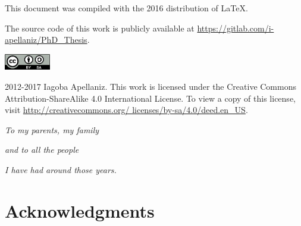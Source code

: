 \documentclass[12pt, letterpaper, twoside]{article}
\numberwithin{equation}{section}
\numberwithin{figure}{section}
\numberwithin{table}{section}
\begin{document}
\renewcommand{\thefootnote}{\fnsymbol{footnote}}

\pagestyle{fancy}
\renewcommand{\headrulewidth}{0pt}
\fancyhead{}
\fancyfoot{}





\cleardoublepage

This document was compiled with the 2016 distribution of \LaTeX.

The source code of this work is publicly available at \url{https://gitlab.com/i-apellaniz/PhD_Thesis}.

\vfill

\includegraphics[height=20pt]{img/0-CreativeCommons-by-sa.png}

2012-2017 Iagoba Apellaniz. This work is licensed under the Creative Commons
Attribution-ShareAlike 4.0 International License. To view a copy of this
license, visit
\href{http://creativecommons.org/licenses/by-sa/4.0/deed.en_US}
{http://creativecommons.org/ licenses/by-sa/4.0/deed.en\_US}.
\clearpage







\cleardoublepage

\fancyfoot{}

\cleardoublepage
\setcounter{page}{1}

\vspace*{100pt}
\begin{center}
\emph{To my parents, my family}

\emph{and to all the people}

\emph{I have had around those years.}
\end{center}

\cleardoublepage

\fancyfoot[LE,RO]{\thepage}
\section*{Acknowledgments}
\end{document}
